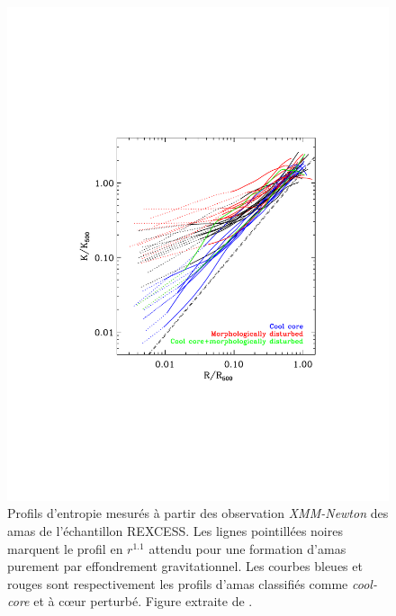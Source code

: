 \begin{figure}[t]
    \centering
    \includegraphics[width=.6\linewidth]{Figures/Chap_nk/entropy_pratt.pdf}
    \caption{
        Profils d'entropie mesurés à partir des observation \textit{XMM-Newton} des amas de l'échantillon REXCESS.
        Les lignes pointillées noires marquent le profil en $r^{1.1}$ attendu pour une formation d'amas purement par effondrement gravitationnel.
        Les courbes bleues et rouges sont respectivement les profils d'amas classifiés comme \textit{cool-core} et à cœur perturbé.
        Figure extraite de \cite{pratt_gas_2010}.
    }
    \label{fig:entropy_rexcess}
\end{figure}

